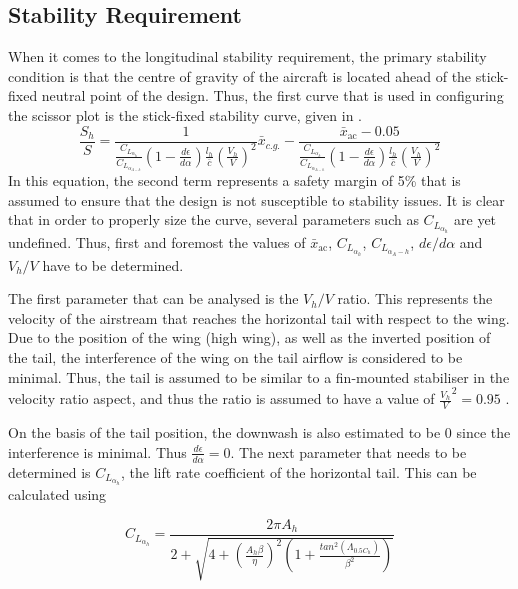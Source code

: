 \subsection{Stability Requirement}\label{subsec:Stability_horiz}
When it comes to the longitudinal stability requirement,
the primary stability condition is
that the centre of gravity of the aircraft is located ahead of the stick-fixed neutral point of the design.
Thus, the first curve that is used in configuring the scissor plot is the stick-fixed stability curve, given in .
\begin{equation}
    \label{Eq:stability_curve}
    \frac{S_h}{S} = \frac{1}{\frac{C_{L_{\alpha_h}}}{C_{L_{\alpha_{A-h}}}}\left(1 - \frac{d\epsilon}{d\alpha}\right)\frac{l_h}{\bar{c}}\left(\frac{V_h}{V}\right)^2}\bar{x}_{c.g.}-\frac{\bar{x}_\text{ac}-0.05}{\frac{C_{L_{\alpha_h}}}{C_{L_{\alpha_{A-h}}}}\left(1 - \frac{d\epsilon}{d\alpha}\right)\frac{l_h}{\bar{c}}\left(\frac{V_h}{V}\right)^2}
\end{equation} 
In this equation, the second term represents a safety margin of 5\% that is assumed to ensure that the design is not susceptible to stability issues.
It is clear that in order to properly size the curve, several parameters such as $C_{L_{\alpha_h}}$ are yet undefined.
Thus, first and foremost the values of $\bar{x}_\text{ac}$, $C_{L_{\alpha_h}}$, $C_{L_{\alpha_A-h}}$, $d\epsilon/d\alpha$ and $V_h/V$ have to be determined.

The first parameter that can be analysed is the $V_h/V$ ratio.
This represents the velocity of the airstream that reaches the horizontal tail with respect to the wing.
Due to the position of the wing (high wing), as well as the inverted position of the tail, the interference of the wing on the tail airflow is considered to be minimal.
Thus, the tail is assumed to be similar to a fin-mounted stabiliser in the velocity ratio aspect, and thus the ratio is assumed to have a value of $\frac{V_h}{V}^2=0.95$ \cite{Seville}.

On the basis of the tail position, the downwash is also estimated to be 0 since the interference is minimal.
Thus $\frac{d\epsilon}{d\alpha} = 0$.
The next parameter that needs to be determined is $C_{L_{\alpha_h}}$, the lift rate coefficient of the horizontal tail.
This can be calculated using \cite{DATCOM}

\begin{equation}
    \label{eq_claplhah}
    C_{L_{\alpha_h}} = \frac{2\pi A_h}{2+\sqrt{4+\left(\frac{A_h\beta}{\eta}\right)^2\left(1+\frac{tan^2(\Lambda_{0.5C_h})}{\beta^2}\right)}}
\end{equation}

